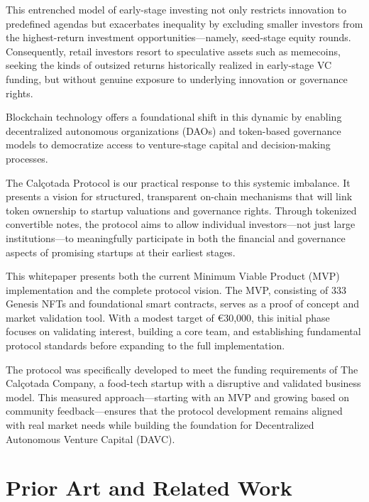 \documentclass[conference]{IEEEtran}
\begin{document}
This entrenched model of early-stage investing not only restricts innovation to predefined agendas but exacerbates inequality by excluding smaller investors from the highest-return investment opportunities—namely, seed-stage equity rounds. Consequently, retail investors resort to speculative assets such as memecoins, seeking the kinds of outsized returns historically realized in early-stage VC funding, but without genuine exposure to underlying innovation or governance rights.

Blockchain technology offers a foundational shift in this dynamic by enabling decentralized autonomous organizations (DAOs) and token-based governance models to democratize access to venture-stage capital and decision-making processes.

The Calçotada Protocol is our practical response to this systemic imbalance. It presents a vision for structured, transparent on-chain mechanisms that will link token ownership to startup valuations and governance rights. Through tokenized convertible notes, the protocol aims to allow individual investors—not just large institutions—to meaningfully participate in both the financial and governance aspects of promising startups at their earliest stages.

This whitepaper presents both the current Minimum Viable Product (MVP) implementation and the complete protocol vision. The MVP, consisting of 333 Genesis NFTs and foundational smart contracts, serves as a proof of concept and market validation tool. With a modest target of €30,000, this initial phase focuses on validating interest, building a core team, and establishing fundamental protocol standards before expanding to the full implementation.

The protocol was specifically developed to meet the funding requirements of The Calçotada Company, a food-tech startup with a disruptive and validated business model. This measured approach—starting with an MVP and growing based on community feedback—ensures that the protocol development remains aligned with real market needs while building the foundation for Decentralized Autonomous Venture Capital (DAVC).

\section{Prior Art and Related Work}
\end{document}
